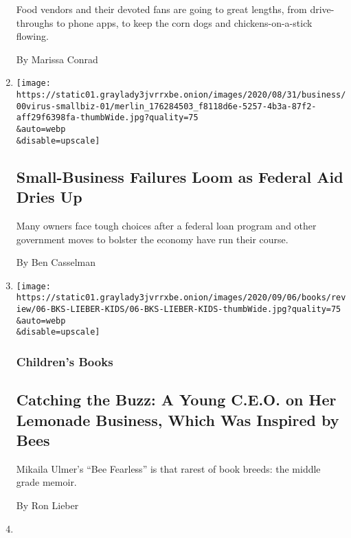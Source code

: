 \begin{enumerate}
  Food vendors and their devoted fans are going to great lengths, from
  drive-throughs to phone apps, to keep the corn dogs and
  chickens-on-a-stick flowing.

  By Marissa Conrad
\item
  \href{/2020/09/01/business/economy/small-businesses-coronavirus.html}{}

  \texttt{[image: https://static01.graylady3jvrrxbe.onion/images/2020/08/31/business/00virus-smallbiz-01/merlin\_176284503\_f8118d6e-5257-4b3a-87f2-aff29f6398fa-thumbWide.jpg?quality=75\\\&auto=webp\\\&disable=upscale]}

  \hypertarget{small-business-failures-loom-as-federal-aid-dries-up}{%
  \subsection{Small-Business Failures Loom as Federal Aid Dries
  Up}\label{small-business-failures-loom-as-federal-aid-dries-up}}

  Many owners face tough choices after a federal loan program and other
  government moves to bolster the economy have run their course.

  By Ben Casselman
\item
  \href{/2020/08/29/books/review/mikaila-ulmer-bee-fearless.html}{}

  \texttt{[image: https://static01.graylady3jvrrxbe.onion/images/2020/09/06/books/review/06-BKS-LIEBER-KIDS/06-BKS-LIEBER-KIDS-thumbWide.jpg?quality=75\\\&auto=webp\\\&disable=upscale]}

  \hypertarget{childrens-books}{%
  \subsubsection{Children's Books}\label{childrens-books}}

  \hypertarget{catching-the-buzz-a-young-ceo-on-her-lemonade-business-which-was-inspired-by-bees}{%
  \subsection{Catching the Buzz: A Young C.E.O. on Her Lemonade
  Business, Which Was Inspired by
  Bees}\label{catching-the-buzz-a-young-ceo-on-her-lemonade-business-which-was-inspired-by-bees}}

  Mikaila Ulmer's ``Bee Fearless'' is that rarest of book breeds: the
  middle grade memoir.

  By Ron Lieber
\item
  \href{/2020/08/25/dining/pizza-farms.html}{}


\end{enumerate}
